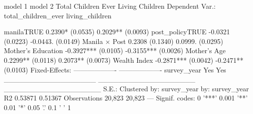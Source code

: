                                model 1             model 2
                   Total Children Ever     Living Children
Dependent Var.:    total_children_ever     living_children
                                                          
manilaTRUE            0.2390* (0.0535)   0.2029** (0.0093)
post_policyTRUE       -0.0321 (0.0223)   -0.0443. (0.0149)
Manila × Post         0.2308 (0.1340)    0.0999. (0.0295)
Mother's Education -0.3927*** (0.0105) -0.3155*** (0.0026)
Mother's Age         0.2299** (0.0118)   0.2073** (0.0073)
Wealth Index       -0.2871*** (0.0042)  -0.2471** (0.0103)
Fixed-Effects:     ------------------- -------------------
survey_year                        Yes                 Yes
__________________ ___________________ ___________________
S.E.: Clustered        by: survey_year     by: survey_year
R2                             0.53871             0.51367
Observations                    20,823              20,823
---
Signif. codes: 0 '***' 0.001 '**' 0.01 '*' 0.05 '.' 0.1 ' ' 1
